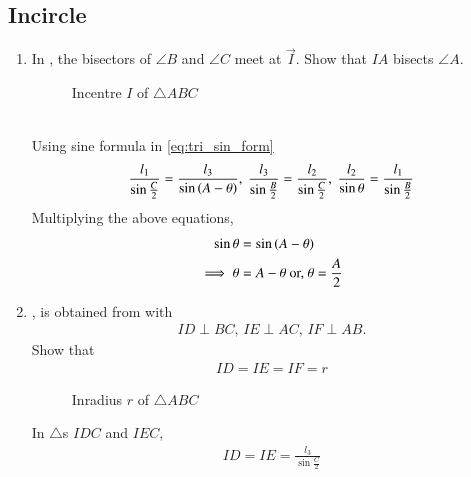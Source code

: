 \subsection{Incircle}
\begin{enumerate}[label=\thesubsection.\arabic*.,ref=\thesubsection.\theenumi]
\item  In  
	, the bisectors of $\angle B$ and $\angle C$	 meet at $\vec{I}$.
Show that $IA$ bisects $\angle A$.
\begin{figure}[!ht]
	\begin{center}
		
		\resizebox{0.6\columnwidth}{!}{}
	\end{center}
	\caption{Incentre $I$ of $\triangle ABC$}
	\label{fig:tri_icentre}	
\end{figure}
\\
\solution
Using sine formula
in
\eqref{eq:tri_sin_form}
  \begin{align}
  \frac{l_1}{\sin\frac{C}{2}}
  = 
   \frac{l_3}{\sin \left(A-\theta\right)}
  ,\
   \frac{l_3}{\sin\frac{B}{2}}
=\frac{l_2}{\sin\frac{C}{2}}
  ,\
\frac{l_2}{\sin \theta}
	  =
  \frac{l_1}{\sin\frac{B}{2}}
  \end{align}
  Multiplying the above equations, 
  \begin{align}
  \sin \theta &= \sin \left(A - \theta\right)
  \\
	  \implies \theta &=A - \theta 
	  \text{ or, } \theta = \frac{A}{2}
  \end{align}
  \item 
	, 
	is obtained from 
	with
  \begin{align}
	  ID \perp BC, \, 
	  IE \perp AC, \, 
	  IF \perp AB.
  \end{align}
  Show that 
  \begin{align}
	  ID=   
	  IE= 
	  IF=r 
	\label{eq:tri_iradius}	
  \end{align}
		\begin{figure}[!ht]
	\begin{center}
		\resizebox{0.6\columnwidth}{!}{}
	\end{center}
	\caption{Inradius $r$ of $\triangle ABC$}
	\label{fig:tri_iradius}	
\end{figure}
		\solution
In $\triangle$s $IDC$ and $IEC$, 
		\begin{align}
ID = IE=  \frac{l_3}{\sin\frac{C}{2}}
		\end{align}

\end{enumerate}

